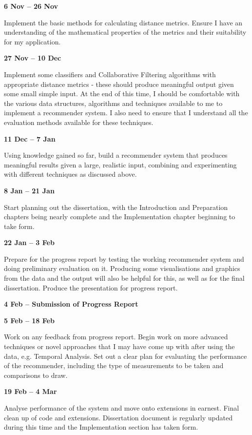 \textbf{6 Nov -- 26 Nov}

Implement the basic methods for calculating distance metrics.
Ensure I have an understanding of the mathematical properties of the metrics and their suitability for my application.

\textbf{27 Nov -- 10 Dec}

Implement some classifiers and Collaborative Filtering algorithms with appropriate distance metrics - these should produce meaningful output given some small simple input.
At the end of this time, I should be comfortable with the various data structures, algorithms and techniques available to me to implement a recommender system.
I also need to ensure that I understand all the evaluation methods available for these techniques.

\textbf{11 Dec -- 7 Jan}

Using knowledge gained so far, build a recommender system that produces meaningful results given a large, realistic input, combining and experimenting with different techniques as discussed above.

\textbf{8 Jan -- 21 Jan}

Start planning out the dissertation, with the Introduction and Preparation chapters being nearly complete and the Implementation chapter beginning to take form.

\textbf{22 Jan -- 3 Feb}

Prepare for the progress report by testing the working recommender system and doing preliminary evaluation on it. Producing some visualisations and graphics from the data and the output will also be helpful for this, as well as for the final dissertation. 
Produce the presentation for progress report.

\textbf{4 Feb -- Submission of Progress Report}

\textbf{5 Feb -- 18 Feb}

Work on any feedback from progress report.
Begin work on more advanced techniques or novel approaches that I may have come up with after using the data, e.g. Temporal Analysis.
Set out a clear plan for evaluating the performance of the recommender, including the type of measurements to be taken and comparisons to draw.

\textbf{19 Feb -- 4 Mar}

Analyse performance of the system and move onto extensions in earnest.
Final clean up of code and extensions.
Dissertation document is regularly updated during this time and the Implementation section has taken form.

